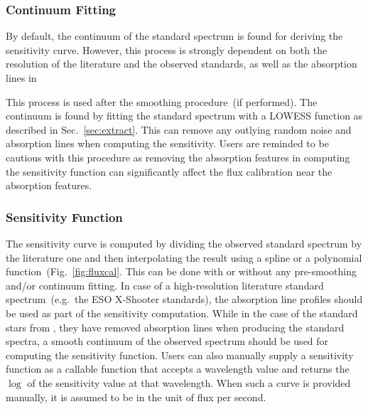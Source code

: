 \documentclass[linenumbers, twocolumn]{aastex631}
\begin{document}
\subsubsection*{Continuum Fitting}
By default, the continuum of the standard spectrum is found for deriving the
sensitivity curve. However, this process is strongly dependent on both the
resolution of the literature and the observed standards, as well as the
absorption lines in 

This process is used after the smoothing procedure~(if performed). The continuum
is found by fitting the standard spectrum with a LOWESS function as described in
Sec.~\ref{sec:extract}. This can remove any outlying random noise and absorption
lines when computing the sensitivity. Users are reminded to be cautious with
this procedure as removing the absorption features in computing the sensitivity
function can significantly affect the flux calibration near the absorption
features.

\subsubsection*{Sensitivity Function}
The sensitivity curve is computed by dividing the observed standard spectrum by
the literature one and then interpolating the result using a spline or a
polynomial function~(Fig.~\ref{fig:fluxcal}. This can be done with or without
any pre-smoothing and/or continuum fitting. In case of a high-resolution
literature standard spectrum~(e.g.\ the ESO X-Shooter standards), the
absorption line profiles should be used as part of the sensitivity computation.
While in the case of the standard stars from \citep{1990AJ.....99.1621O},
they have removed absorption lines when producing the standard spectra, a
smooth continuum of the observed spectrum should be used for computing
the sensitivity function. Users can also manually supply a sensitivity function
as a callable function that accepts a wavelength value and returns the $\log$
of the sensitivity value at that wavelength. When such a curve is provided
manually, it is assumed to be in the unit of flux per second.
\end{document}

